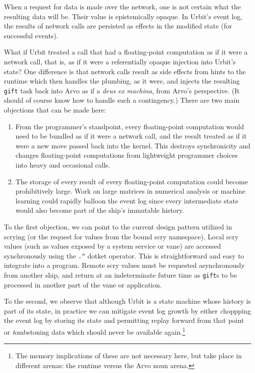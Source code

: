 \documentclass[twoside]{article}
\begin{document}
When a request for data is made over the network, one is not certain what the resulting data will be.  Their value is epistemically opaque.  In Urbit's event log, the results of network calls are persisted as effects in the modified state (for successful events).

What if Urbit treated a call that had a floating-point computation as if it were a network call, that is, as if it were a referentially opaque injection into Urbit's state?  One difference is that network calls result as side effects from hints to the runtime which then handles the plumbing, as it were, and injects the resulting \texttt{gift} task back into Arvo as if a \emph{deus ex machina}, from Arvo's perspective.  (It should of course know how to handle such a contingency.)  There are two main objections that can be made here:

\begin{enumerate}
  \item  From the programmer's standpoint, every floating-point computation would need to be bundled as if it were a network call, and the result treated as if it were a new move passed back into the kernel.  This destroys synchronicity and changes floating-point computations from lightweight programmer choices into heavy and occasional calls.

  \item  The storage of every result of every floating-point computation could become prohibitively large.  Work on large matrices in numerical analysis or machine learning could rapidly balloon the event log since every intermediate state would also become part of the ship's immutable history.
\end{enumerate}

To the first objection, we can point to the current design pattern utilized in scrying (or the request for values from the bound scry namespace).  Local scry values (such as values exposed by a system service or vane) are accessed synchronously using the \texttt{.\^} dotket operator.  This is straightforward and easy to integrate into a program.  Remote scry values must be requested asynchronously from another ship, and return at an indeterminate future time as \texttt{gift}s to be processed in another part of the vane or application.

To the second, we observe that although Urbit is a state machine whose history is part of its state, in practice we can mitigate event log growth by either {\emph choppping} the event log by storing its state and permitting replay forward from that point or {\emph tombstoning} data which should never be available again.\footnote{The memory implications of these are not necessary here, but take place in different arenas:  the runtime versus the Arvo noun arena.}
\end{document}
